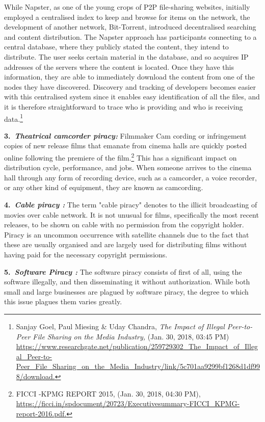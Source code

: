 \begin{multicols}{2}
\noi
While Napster, as one of the young crops of P2P file-sharing websites, initially employed a
centralised index to keep and browse for items on the network, the development of another
network, Bit-Torrent, introduced decentralised searching and content distribution. The
Napster approach has participants connecting to a central database, where they publicly stated
the content, they intend to distribute. The user seeks certain material in the database, and so
acquires IP addresses of the servers where the content is located. Once they have this
information, they are able to immediately download the content from one of the nodes they
have discovered. Discovery and tracking of developers becomes easier with this centralised
system since it enables easy identification of all the files, and it is therefore straightforward to
trace who is providing and who is receiving data.\footnote{Sanjay Goel, Paul Miesing \& Uday Chandra, \textit{The Impact of Illegal Peer-to-Peer File Sharing on the Media Industry,} (Jan. 30, 2018, 03:45 PM)  \url{https://www.researchgate.net/publication/259729302_The_Impact_of_Illegal_Peer-to-Peer_File_Sharing_on_the_Media_Industry/link/5c701aa9299bf1268d1df998/download.}}

\noi
{\large \bfseries 3.~\textit{Theatrical camcorder piracy:}}  Filmmaker Cam cording or infringement copies of new
release films that emanate from cinema halls are quickly posted online following the
premiere of the film.\footnote{FICCI -KPMG REPORT 2015, (Jan. 30, 2018, 04:30 PM), \url{https://ficci.in/spdocument/20723/Executivesummary-FICCI_KPMG-report-2016.pdf.}} This has a significant impact on distribution cycle, performance, and jobs. When someone arrives to the cinema hall through any form of recording device, such as
a camcorder, a voice recorder, or any other kind of equipment, they are known as camcording.

\noi
{\large \bfseries 4.~\textit{Cable piracy :}} The term "cable piracy" denotes to the illicit broadcasting of movies over
cable network. It is not unusual for films, specifically the most recent releases, to be shown
on cable with no permission from the copyright holder. Piracy is an uncommon occurrence
with satellite channels due to the fact that these are usually organised and are largely used for
distributing films without having paid for the necessary copyright permissions.

\noi
{\large \bfseries 5.~\textit{Software Piracy :}} The software piracy consists of first of all, using the software illegally,
and then disseminating it without authorization. While both small and large businesses are
plagued by software piracy, the degree to which this issue plagues them varies greatly.


\end{multicols}
